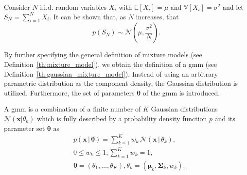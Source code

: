 \documentclass[../../../main.tex]{subfiles}
\begin{document}
\begin{definition}\label{th:central_limit} 
Consider $N$ i.i.d. random variables $X_i$ with $\mathbb{E}[X_i]=\mu$ and $\mathbb{V}[X_i]=\sigma^2$ and let $S_N=\sum^N_{i=1}X_i$. It can be shown that, as $N$ increases, that
\begin{equation*}
    p(S_N) \sim \mathcal{N}\left(\mu, \frac{\sigma^2}{N}\right).
\end{equation*}
\end{definition}

By further specifying the general definition of mixture models (see Definition~\ref{th:mixture_model}), we obtain the definition of a \gls{gmm} (see Definition~\ref{th:gaussian_mixture_model}). Instead of using an arbitrary parametric distribution as the component density, the Gaussian distribution is utilized. Furthermore, the set of parameters $\bm{\theta}$ of the \gls{gmm} is introduced.

\begin{definition}\label{def:gmm}\label{th:gaussian_mixture_model}
A \acrlong{gmm} is a combination of a finite number of $K$ Gaussian distributions $\mathcal{N}(\bm{x}|\theta_k)$ which is fully described by a probability density function $p$ and its parameter set $\bm{\theta}$ as
\begin{equation}\label{eq:gmm_def}
    \begin{aligned}
        &p(\bm{x} \, | \, \bm{\theta}) = \sum\limits_{k=1}^K w_k \, \mathcal{N}(\bm{x} \, | \, \theta_k), \\
        &0 \leq w_k \leq 1, \sum\limits_{k=1}^K w_k = 1, \\
        &\bm{\theta} = (\theta_1, \dots, \theta_K), \theta_k = (\bm{\mu}_k, \bm{\Sigma}_k, w_k).
    \end{aligned}
\end{equation}
\end{definition}
\end{document}
